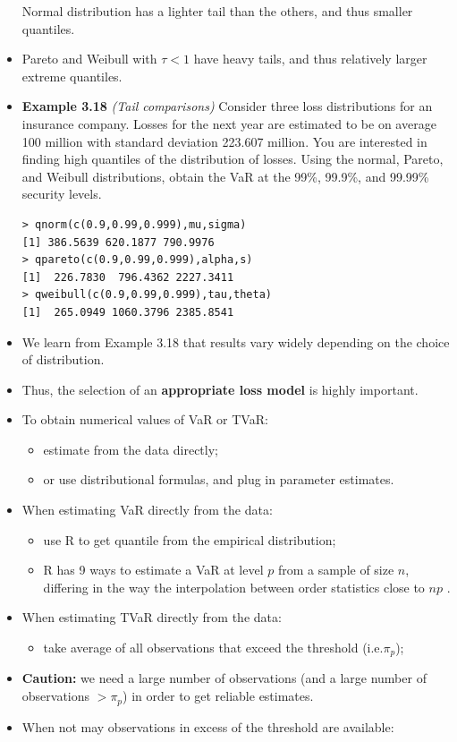 \documentclass[]{book}
\providecommand{\tightlist}{%
  \setlength{\itemsep}{0pt}\setlength{\parskip}{0pt}}
\begin{document}
\begin{itemize}
  Normal distribution has a lighter tail than the others, and thus
  smaller quantiles.
\item
  Pareto and Weibull with \(\tau<1\) have heavy tails, and thus
  relatively larger extreme quantiles.
\item
  \textbf{Example 3.18} \emph{(Tail comparisons)} Consider three loss
  distributions for an insurance company. Losses for the next year are
  estimated to be on average 100 million with standard deviation 223.607
  million. You are interested in finding high quantiles of the
  distribution of losses. Using the normal, Pareto, and Weibull
  distributions, obtain the VaR at the 99\%, 99.9\%, and 99.99\%
  security levels.

\begin{verbatim}
> qnorm(c(0.9,0.99,0.999),mu,sigma)
[1] 386.5639 620.1877 790.9976
> qpareto(c(0.9,0.99,0.999),alpha,s)
[1]  226.7830  796.4362 2227.3411
> qweibull(c(0.9,0.99,0.999),tau,theta)
[1]  265.0949 1060.3796 2385.8541
\end{verbatim}
\item
  We learn from Example 3.18 that results vary widely depending on the
  choice of distribution.
\item
  Thus, the selection of an \textbf{appropriate loss model} is highly
  important.
\item
  To obtain numerical values of VaR or TVaR:

  \begin{itemize}
  \item
    estimate from the data directly;
  \item
    or use distributional formulas, and plug in parameter estimates.
  \end{itemize}
\item
  When estimating VaR directly from the data:

  \begin{itemize}
  \item
    use R to get quantile from the empirical distribution;
  \item
    R has 9 ways to estimate a VaR at level \(p\) from a sample of size
    \(n\), differing in the way the interpolation between order
    statistics close to \(np\) .
  \end{itemize}
\item
  When estimating TVaR directly from the data:

  \begin{itemize}
  \tightlist
  \item
    take average of all observations that exceed the threshold
    (i.e.\(\pi_p\));
  \end{itemize}
\item
  \textbf{Caution:} we need a large number of observations (and a large
  number of observations \(> \pi_p\)) in order to get reliable
  estimates.
\item
  When not may observations in excess of the threshold are available:


\end{itemize}
\end{document}
